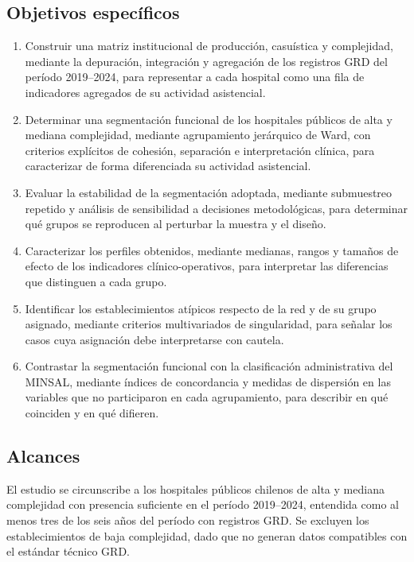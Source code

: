 \subsection{Objetivos específicos}
\label{sec:objetivos-especificos}

\begin{enumerate}
  \item Construir una matriz institucional de producción, casuística y
        complejidad, mediante la depuración, integración y agregación de los
        registros GRD del período 2019--2024, para representar a cada hospital
        como una fila de indicadores agregados de su actividad asistencial.
  \item Determinar una segmentación funcional de los hospitales públicos de
        alta y mediana complejidad, mediante agrupamiento jerárquico de Ward,
        con criterios explícitos de cohesión, separación e interpretación
        clínica, para caracterizar de forma diferenciada su actividad
        asistencial.
  \item Evaluar la estabilidad de la segmentación adoptada, mediante
        submuestreo repetido y análisis de sensibilidad a decisiones
        metodológicas, para determinar qué grupos se reproducen al perturbar
        la muestra y el diseño.
  \item Caracterizar los perfiles obtenidos, mediante medianas, rangos y
        tamaños de efecto de los indicadores clínico-operativos, para
        interpretar las diferencias que distinguen a cada grupo.
  \item Identificar los establecimientos atípicos respecto de la red y de su
        grupo asignado, mediante criterios multivariados de singularidad, para
        señalar los casos cuya asignación debe interpretarse con cautela.
  \item Contrastar la segmentación funcional con la clasificación
        administrativa del MINSAL, mediante índices de concordancia y medidas
        de dispersión en las variables que no participaron en cada
        agrupamiento, para describir en qué coinciden y en qué difieren.
\end{enumerate}

\subsection{Alcances}
\label{sec:alcances}

El estudio se circunscribe a los hospitales públicos chilenos de alta y mediana
complejidad con presencia suficiente en el período 2019--2024, entendida como al
menos tres de los seis años del período con registros GRD. Se excluyen los
establecimientos de baja complejidad, dado que no generan datos compatibles con
el estándar técnico GRD.

